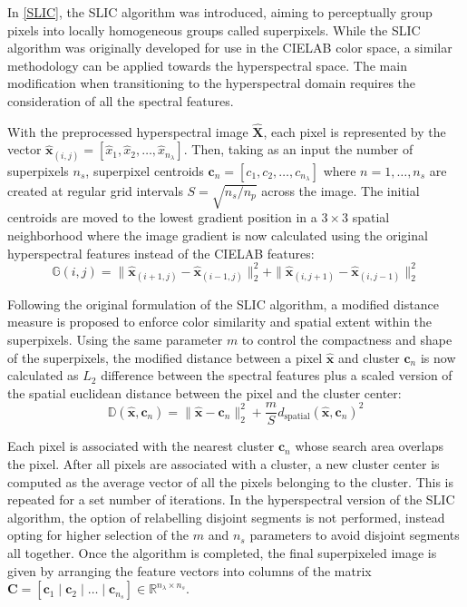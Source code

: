 In \ref{SLIC}, the SLIC algorithm was introduced, aiming to perceptually group pixels into locally homogeneous groups called superpixels. While the SLIC algorithm was originally developed for use in the CIELAB color space, a similar methodology can be applied towards the hyperspectral space. The main modification when transitioning to the hyperspectral domain requires the consideration of all the spectral features.

With the preprocessed hyperspectral image $\hat{\mathbf{X}}$, each pixel is represented by the vector $\hat{\mathbf{x}}_{(i,j)} = [\hat{x}_1, \hat{x}_2, \dots, \hat{x}_{n_\lambda}]$. Then, taking as an input the number of superpixels $n_s$, superpixel centroids $\mathbf{c}_n = [c_1, c_2, \dots, c_{n_\lambda}]$ where $n = 1,\dots, n_s$ are created at regular grid intervals $S = \sqrt{n_s/n_p}$ across the image. The initial centroids are moved to the lowest gradient position in a $3 \times 3$ spatial neighborhood where the image gradient is now calculated using the original hyperspectral features instead of the CIELAB features: 
\begin{equation}
    \label{eq:slic-gradient-2}
    \mathbb{G}(i,j) = \|\hat{\mathbf{x}}_{(i+1,j)} - \hat{\mathbf{x}}_{(i-1,j)} \|_2^2 + \|\hat{\mathbf{x}}_{(i,j+1)} - \hat{\mathbf{x}}_{(i,j-1)} \|_2^2
\end{equation}

Following the original formulation of the SLIC algorithm, a modified distance measure is proposed to enforce color similarity and spatial extent within the superpixels. Using the same parameter $m$ to control the compactness and shape of the superpixels, the modified distance between a pixel $\hat{\mathbf{x}}$ and cluster $\mathbf{c}_n$ is now calculated as $L_2$ difference between the spectral features plus a scaled version of the spatial euclidean distance between the pixel and the cluster center:
\begin{equation}
    \label{eq:slic-cielab-distance-hsi}
    \mathbb{D}(\hat{\mathbf{x}}, \mathbf{c}_n) = \|\hat{\mathbf{x}} - \mathbf{c}_n\|_2^2 + \frac{m}{S}d_{\text{spatial}}(\hat{\mathbf{x}}, \mathbf{c}_n)^2
\end{equation}

Each pixel is associated with the nearest cluster $\mathbf{c}_n$ whose search area overlaps the pixel. After all pixels are associated with a cluster, a new cluster center is computed as the average vector of all the pixels belonging to the cluster. This is repeated for a set number of iterations. In the hyperspectral version of the SLIC algorithm, the option of relabelling disjoint segments is not performed, instead opting for higher selection of the $m$ and $n_s$ parameters to avoid disjoint segments all together. Once the algorithm is completed, the final superpixeled image is given by arranging the feature vectors into columns of the matrix $\mathbf{C} = [\mathbf{c}_1 \; | \;\mathbf{c}_2 \;| \;\dots \;|\; \mathbf{c}_{n_s}] \in \mathbb{R}^{n_\lambda \times n_s}$. 


